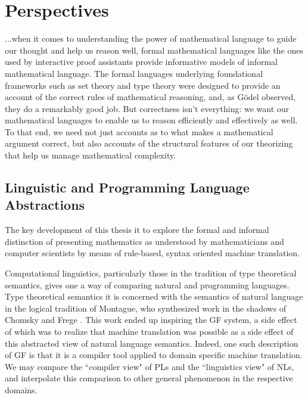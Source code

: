 \section{Perspectives}

\begin{displayquote}

...when it comes to understanding the power of mathematical language to guide our
thought and help us reason well, formal mathematical languages like the ones
used by interactive proof assistants provide informative models of informal
mathematical language. The formal languages underlying foundational frameworks
such as set theory and type theory were designed to provide an account of the
correct rules of mathematical reasoning, and, as Gödel observed, they do a
remarkably good job. But correctness isn’t everything: we want our mathematical
languages to enable us to reason efficiently and effectively as well. To that
end, we need not just accounts as to what makes a mathematical argument correct,
but also accounts of the structural features of our theorizing that help us
manage mathematical complexity.\cite{avigad2015mathematics}

\end{displayquote}

\subsection{Linguistic and Programming Language Abstractions}

The key development of this thesis it to explore the formal and informal
distinction of presenting mathematics as understood by mathematicians and computer
scientists by means of rule-based, syntax oriented machine translation.

Computational linguistics, particularly those in the tradition of type
theoretical semantics\cite{ranta1994type}, gives one a way of comparing natural
and programming languages. Type theoretical semantics it is concerned with the
semantics of natural language in the logical tradition of Montague, who
synthesized work in the shadows of Chomsky \cite{Chomsky57} and Frege
\cite{frege79}. This work ended up inspiring the GF system, a side effect of
which was to realize that machine translation was possible as a side effect of
this abstracted view of natural language semantics. Indeed, one such description
of GF is that it is a compiler tool applied to domain specific machine
translation. We may compare the ``compiler view" of PLs and the ``linguistics view"
of NLs, and interpolate this comparison to other general phenomenon in the
respective domains.

